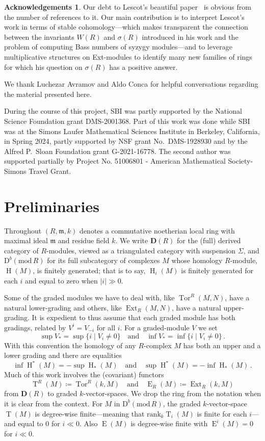 \documentclass{amsart}
\numberwithin{equation}{section}
\theoremstyle{plain}
\theoremstyle{definition}
\newtheorem*{ack}{Acknowledgements}
\theoremstyle{remark}
\newcommand{\dbcat}[1]{\mathrm{D}^b(\mathrm{mod}\,{#1})}
\newcommand{\dcat}{\mathbf{D}}
\newcommand{\eee}{\operatorname{E}}
\newcommand{\ext}{\operatorname{Ext}}
\newcommand{\hh}{\operatorname{H}}
\newcommand{\rank}{\mathrm{rank}}
\newcommand{\tee}{\operatorname{T}}
\newcommand{\tor}{\operatorname{Tor}}
\newcommand{\fm}{\mathfrak{m}}
\begin{document}
\begin{ack}
Our debt to Lescot's beautiful paper~\cite{Lescot:1986} is obvious from the number of references to it.  Our main contribution is to interpret Lescot's work in terms of stable cohomology---which makes transparent the connection between the invariants $W(R)$ and $\sigma(R)$ introduced in his work and the problem of computing Bass numbers of syzygy modules---and to leverage multiplicative structures on Ext-modules to identify many new families of rings for which his question on $\sigma(R)$ has a positive answer.

We thank Luchezar Avramov and Aldo Conca for helpful conversations regarding the material presented here.

During the course of this project, SBI was partly supported by the National Science Foundation grant DMS-2001368. Part of this work was done while SBI was at the Simons Laufer Mathematical Sciences Institute in Berkeley, California, in Spring 2024,  partly supported by NSF grant No.\ DMS-1928930 and by the Alfred P.\ Sloan Foundation grant G-2021-16778. The second author was supported partially by Project No. 51006801 - American Mathematical Society-Simons Travel Grant.
\end{ack}

\section{Preliminaries}
\label{se:prelims}
Throughout $(R,\fm,k)$ denotes a commutative noetherian local ring with maximal ideal $\fm$ and residue field $k$. We write $\dcat(R)$ for the (full) derived category of $R$-modules, viewed as a triangulated category with suspension $\Sigma$, and $\dbcat R$ for its full subcategory of complexes $M$ whose homology $R$-module, $\hh(M)$,  is finitely generated; that is to say, $\hh_i(M)$ is finitely generated for each $i$ and equal to zero when $|i|\gg 0$.

Some of the graded modules we have to deal with, like $\tor^R(M,N)$, have a natural lower-grading and others, like $\ext_R(M,N)$, have a natural upper-grading. It is expedient to thus assume that each graded module has both gradings, related by $V^i=V_{-i}$ for all $i$.  For a graded-module $V$ we set 
\[
\sup V_* = \sup\{i\mid V_i\ne 0\} \quad\text{and} \quad \inf V_* = \inf\{i\mid V_i\ne 0\}\,.
\]
With this convention the homology of any $R$-complex $M$ has both an upper and a lower grading and there are equalities
\[
\inf \hh^*(M) = - \sup \hh_*(M) \quad\text{and}\quad \sup \hh^*(M) = -\inf \hh_*(M)\,.
\]
Much of this work involves the (covariant) functors
\begin{equation}
    \label{eq:etfunctors}
\tee^R(M)\coloneqq \tor^R(k,M)\quad\text{and}\quad \eee_R(M) \coloneqq \ext_R(k,M)
\end{equation}
from $\dcat(R)$ to graded $k$-vector-spaces. We drop the ring from the notation when it is clear from the context. For $M$ in $\dbcat R$, the graded $k$-vector-space $\tee(M)$ is degree-wise finite---meaning that $\rank_k \tee_i(M)$ is finite for each $i$---and equal to $0$ for $i\ll 0$. Also $\eee(M)$ is degree-wise finite with $\eee^i(M)=0$ for $i\ll 0$.
\end{document}
